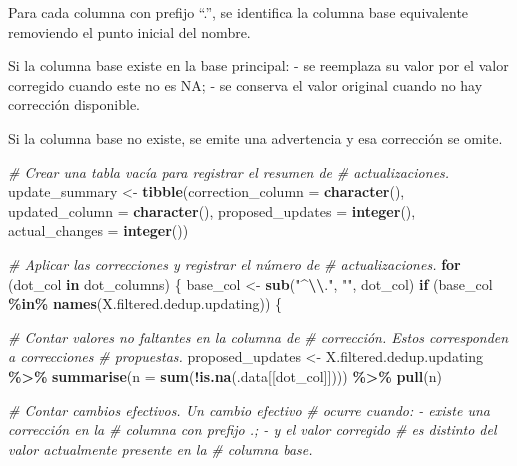 \documentclass[sn-apa,pdflatex]{sn-jnl}
\newenvironment{Shaded}{\begin{snugshade}}{\end{snugshade}}
\newcommand{\AttributeTok}[1]{\textcolor[rgb]{0.13,0.29,0.53}{#1}}
\newcommand{\CommentTok}[1]{\textcolor[rgb]{0.56,0.35,0.01}{\textit{#1}}}
\newcommand{\ControlFlowTok}[1]{\textcolor[rgb]{0.13,0.29,0.53}{\textbf{#1}}}
\newcommand{\FunctionTok}[1]{\textcolor[rgb]{0.13,0.29,0.53}{\textbf{#1}}}
\newcommand{\NormalTok}[1]{#1}
\newcommand{\OtherTok}[1]{\textcolor[rgb]{0.56,0.35,0.01}{#1}}
\newcommand{\SpecialCharTok}[1]{\textcolor[rgb]{0.81,0.36,0.00}{\textbf{#1}}}
\newcommand{\StringTok}[1]{\textcolor[rgb]{0.31,0.60,0.02}{#1}}
\begin{document}
Para cada columna con prefijo ``.'', se identifica la columna base
equivalente removiendo el punto inicial del nombre.

Si la columna base existe en la base principal: - se reemplaza su valor
por el valor corregido cuando este no es NA; - se conserva el valor
original cuando no hay corrección disponible.

Si la columna base no existe, se emite una advertencia y esa corrección
se omite.

\begin{Shaded}
\begin{Highlighting}[]
\CommentTok{\# Crear una tabla vacía para registrar el resumen de}
\CommentTok{\# actualizaciones.}
\NormalTok{update\_summary }\OtherTok{\textless{}{-}} \FunctionTok{tibble}\NormalTok{(}\AttributeTok{correction\_column =} \FunctionTok{character}\NormalTok{(), }\AttributeTok{updated\_column =} \FunctionTok{character}\NormalTok{(),}
    \AttributeTok{proposed\_updates =} \FunctionTok{integer}\NormalTok{(), }\AttributeTok{actual\_changes =} \FunctionTok{integer}\NormalTok{())}


\CommentTok{\# Aplicar las correcciones y registrar el número de}
\CommentTok{\# actualizaciones.}
\ControlFlowTok{for}\NormalTok{ (dot\_col }\ControlFlowTok{in}\NormalTok{ dot\_columns) \{}
\NormalTok{    base\_col }\OtherTok{\textless{}{-}} \FunctionTok{sub}\NormalTok{(}\StringTok{"\^{}}\SpecialCharTok{\textbackslash{}\textbackslash{}}\StringTok{."}\NormalTok{, }\StringTok{""}\NormalTok{, dot\_col)}
    \ControlFlowTok{if}\NormalTok{ (base\_col }\SpecialCharTok{\%in\%} \FunctionTok{names}\NormalTok{(X.filtered.dedup.updating)) \{}

        \CommentTok{\# Contar valores no faltantes en la columna de}
        \CommentTok{\# corrección.  Estos corresponden a correcciones}
        \CommentTok{\# propuestas.}
\NormalTok{        proposed\_updates }\OtherTok{\textless{}{-}}\NormalTok{ X.filtered.dedup.updating }\SpecialCharTok{\%\textgreater{}\%}
            \FunctionTok{summarise}\NormalTok{(}\AttributeTok{n =} \FunctionTok{sum}\NormalTok{(}\SpecialCharTok{!}\FunctionTok{is.na}\NormalTok{(.data[[dot\_col]]))) }\SpecialCharTok{\%\textgreater{}\%}
            \FunctionTok{pull}\NormalTok{(n)}

        \CommentTok{\# Contar cambios efectivos.  Un cambio efectivo}
        \CommentTok{\# ocurre cuando: {-} existe una corrección en la}
        \CommentTok{\# columna con prefijo \textquotesingle{}.\textquotesingle{}; {-} y el valor corregido}
        \CommentTok{\# es distinto del valor actualmente presente en la}
        \CommentTok{\# columna base.}


\end{Highlighting}
\end{Shaded}
\end{document}
